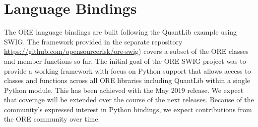 \documentclass[12pt, a4paper]{article}
\begin{document}
\section{Language Bindings}
The ORE language bindings are built following the QuantLib example using SWIG. The framework provided in the separate repository
\url{https://github.com/opensourcerisk/ore-swig}) covers a subset of the ORE classes and member functions so far. The initial goal of the ORE-SWIG project was to provide a working framework with focus on Python support that allows access to
classes and functions across all ORE libraries including QuantLib within a single Python module. This has been achieved with the May 2019 release. We expect that coverage will be extended over the course of the next releases. Because of the
community's expressed interest in Python bindings, we expect contributions from the ORE community over time.
\end{document}
